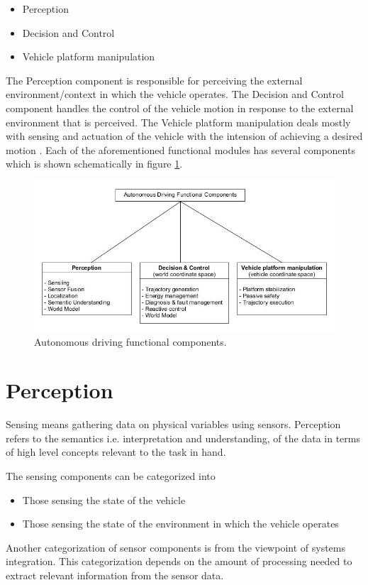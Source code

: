 \begin{itemize}
\item Perception
\item Decision and Control
\item Vehicle platform manipulation
\end{itemize}


The Perception component is responsible for perceiving the external environment/context in which the vehicle operates.  
The Decision and Control component handles the control of the vehicle motion in response to the external environment that is perceived. 
The Vehicle platform manipulation deals mostly with sensing and actuation of the vehicle with the intension of achieving a desired motion \cite{Bahere}.
Each of the aforementioned functional modules has several components which is shown schematically in figure \ref{autonomous_driving_components}. 



\begin{figure}[!htb]
\begin{center}
\includegraphics[scale=0.380]{img/autonomous_driving_components.jpg}
\end{center}
\caption{Autonomous driving functional components.}
\label{autonomous_driving_components}
\end{figure}


\section{Perception}

Sensing means gathering data on physical variables using sensors. Perception refers to the semantics 
i.e. interpretation and understanding, of the data in terms of high level concepts relevant to the task in hand.

The sensing components can be categorized into \cite{Bahere}
\begin{itemize}
\item Those sensing the state of the vehicle 
\item Those sensing the state of the environment in which the vehicle operates
\end{itemize}
Another categorization of sensor components is from the viewpoint of systems integration. 
This categorization depends on the amount of processing needed to extract relevant information from the sensor data.

